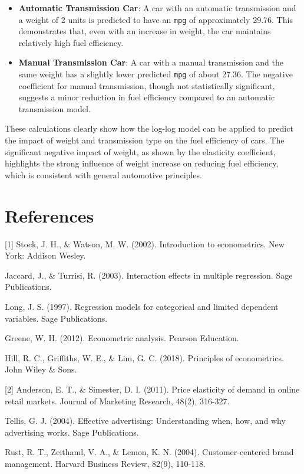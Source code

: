 \documentclass[
  letterpaper,
  DIV=11,
  numbers=noendperiod]{scrreport}
\providecommand{\tightlist}{%
  \setlength{\itemsep}{0pt}\setlength{\parskip}{0pt}}\usepackage{longtable,booktabs,array}
\begin{document}
\begin{itemize}
\tightlist
\item
  \textbf{Automatic Transmission Car}: A car with an automatic
  transmission and a weight of 2 units is predicted to have an
  \texttt{mpg} of approximately 29.76. This demonstrates that, even with
  an increase in weight, the car maintains relatively high fuel
  efficiency.
\item
  \textbf{Manual Transmission Car}: A car with a manual transmission and
  the same weight has a slightly lower predicted \texttt{mpg} of about
  27.36. The negative coefficient for manual transmission, though not
  statistically significant, suggests a minor reduction in fuel
  efficiency compared to an automatic transmission model.
\end{itemize}

These calculations clearly show how the log-log model can be applied to
predict the impact of weight and transmission type on the fuel
efficiency of cars. The significant negative impact of weight, as shown
by the elasticity coefficient, highlights the strong influence of weight
increase on reducing fuel efficiency, which is consistent with general
automotive principles.

\section{References}\label{references}

{[}1{]} Stock, J. H., \& Watson, M. W. (2002). Introduction to
econometrics. New York: Addison Wesley.

Jaccard, J., \& Turrisi, R. (2003). Interaction effects in multiple
regression. Sage Publications.

Long, J. S. (1997). Regression models for categorical and limited
dependent variables. Sage Publications.

Greene, W. H. (2012). Econometric analysis. Pearson Education.

Hill, R. C., Griffiths, W. E., \& Lim, G. C. (2018). Principles of
econometrics. John Wiley \& Sons.

{[}2{]} Anderson, E. T., \& Simester, D. I. (2011). Price elasticity of
demand in online retail markets. Journal of Marketing Research, 48(2),
316-327.

Tellis, G. J. (2004). Effective advertising: Understanding when, how,
and why advertising works. Sage Publications.

Rust, R. T., Zeithaml, V. A., \& Lemon, K. N. (2004). Customer-centered
brand management. Harvard Business Review, 82(9), 110-118.
\end{document}
